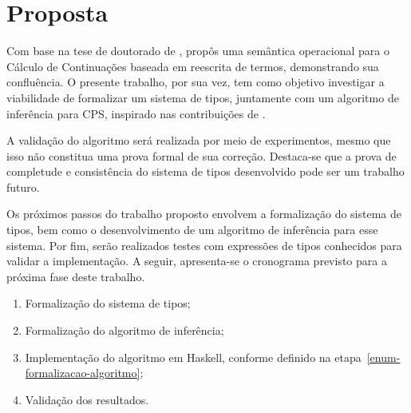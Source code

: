 \chapter{Proposta}\label{ch:proposta}

Com base na tese de doutorado de ,  propôs uma semântica operacional para o Cálculo de Continuações baseada em reescrita de termos, demonstrando sua confluência.
O presente trabalho, por sua vez, tem como objetivo investigar a viabilidade de formalizar um sistema de tipos, juntamente com um algoritmo de inferência para CPS, inspirado nas contribuições de .

A validação do algoritmo será realizada por meio de experimentos, mesmo que isso não constitua uma prova formal de sua correção.
Destaca-se que a prova de completude e consistência do sistema de tipos desenvolvido pode ser um trabalho futuro.

Os próximos passos do trabalho proposto envolvem a formalização do sistema de tipos, bem como o desenvolvimento de um algoritmo de inferência para esse sistema.
Por fim, serão realizados testes com expressões de tipos conhecidos para validar a implementação.
A seguir, apresenta-se o cronograma previsto para a próxima fase deste trabalho.

\begin{enumerate}
	\item Formalização do sistema de tipos;
	\item Formalização do algoritmo de inferência;\label{enum-formalizacao-algoritmo}
	\item Implementação do algoritmo em Haskell, conforme definido na etapa~\ref{enum-formalizacao-algoritmo};
	\item Validação dos resultados.
\end{enumerate}

